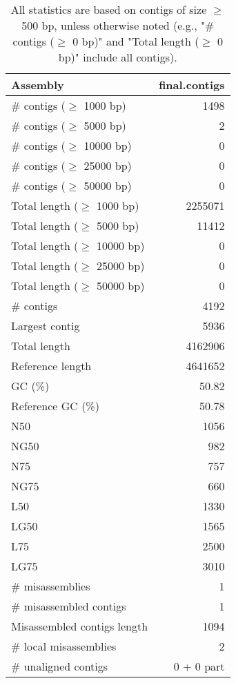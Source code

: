 \documentclass[12pt,a4paper]{article}
\begin{document}
\begin{table}[ht]
\begin{center}
\caption{All statistics are based on contigs of size $\geq$ 500 bp, unless otherwise noted (e.g., "\# contigs ($\geq$ 0 bp)" and "Total length ($\geq$ 0 bp)" include all contigs).}
\begin{tabular}{|l*{1}{|r}|}
\hline
Assembly & final.contigs \\ \hline
\# contigs ($\geq$ 1000 bp) & 1498 \\ \hline
\# contigs ($\geq$ 5000 bp) & 2 \\ \hline
\# contigs ($\geq$ 10000 bp) & 0 \\ \hline
\# contigs ($\geq$ 25000 bp) & 0 \\ \hline
\# contigs ($\geq$ 50000 bp) & 0 \\ \hline
Total length ($\geq$ 1000 bp) & 2255071 \\ \hline
Total length ($\geq$ 5000 bp) & 11412 \\ \hline
Total length ($\geq$ 10000 bp) & 0 \\ \hline
Total length ($\geq$ 25000 bp) & 0 \\ \hline
Total length ($\geq$ 50000 bp) & 0 \\ \hline
\# contigs & 4192 \\ \hline
Largest contig & 5936 \\ \hline
Total length & 4162906 \\ \hline
Reference length & 4641652 \\ \hline
GC (\%) & 50.82 \\ \hline
Reference GC (\%) & 50.78 \\ \hline
N50 & 1056 \\ \hline
NG50 & 982 \\ \hline
N75 & 757 \\ \hline
NG75 & 660 \\ \hline
L50 & 1330 \\ \hline
LG50 & 1565 \\ \hline
L75 & 2500 \\ \hline
LG75 & 3010 \\ \hline
\# misassemblies & 1 \\ \hline
\# misassembled contigs & 1 \\ \hline
Misassembled contigs length & 1094 \\ \hline
\# local misassemblies & 2 \\ \hline
\# unaligned contigs & 0 + 0 part \\ \hline

\end{tabular}
\end{center}
\end{table}
\end{document}
